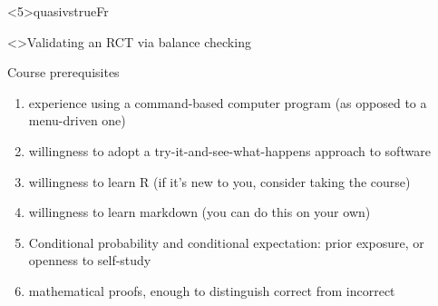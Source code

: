 \againframe<5\mynoteonly>{quasivstrueFr}

\begin{frame}<\nottheirhandout>{Validating an RCT via balance checking}
  \begin{center}
  \end{center}
\end{frame}

\begin{frame}{Course prerequisites}
  \begin{enumerate}
\item experience using a command-based computer program (as opposed to a menu-driven one)
\item willingness to adopt a try-it-and-see-what-happens approach to software
\item willingness to learn R  (if it's new to you, consider taking the course)
\item willingness to learn markdown (you can do this on your own)
\item Conditional probability and conditional expectation: prior
  exposure, or openness to self-study
  \item mathematical proofs, enough to distinguish correct from incorrect 


  \end{enumerate}
\end{frame}




